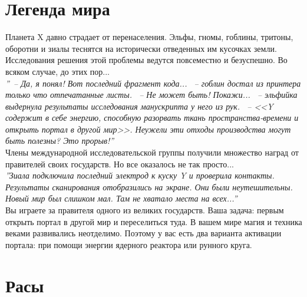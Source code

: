 \documentclass[a4paper,12pt,landscape]{article}
\begin{document}
  \section{Легенда мира}
  Планета X давно страдает от перенаселения. Эльфы, гномы, гоблины, тритоны, оборотни и зиалы теснятся на исторически отведенных им кусочках земли. Исследования решения этой проблемы ведутся повсеместно и безуспешно. Во всяком случае, до этих пор...
~\\  

\textit{''~-- Да, я понял! Вот последний фрагмент кода... ~-- гоблин достал из принтера только что отпечатанные листы.
~-- Не может быть! Покажи... ~-- эльфийка выдернула результаты исследования манускрипта у него из рук. ~-- <<Y содержит в себе энергию, способную разорвать ткань пространства-времени и открыть портал в другой мир>>. Неужели эти отходы производства могут быть полезны? Это прорыв!''}
~\\  

Члены международной исследовательской группы получили множество наград от правителей своих государств. Но все оказалось не так просто...
~\\

\textit{''Зиала подключила последний электрод к куску Y и проверила контакты. Результаты сканирования отобразились на экране. Они были неутешительны. Новый мир был слишком мал. Там не хватало места на всех...''}
~\\

Вы играете за правителя одного из великих государств. Ваша задача: первым открыть портал в другой мир и переселиться туда. В вашем мире магия и техника веками развивались неотделимо. Поэтому у вас есть два варианта активации портала: при помощи энергии ядерного реактора или рунного круга.

  \section{Расы}
  
\end{document}
